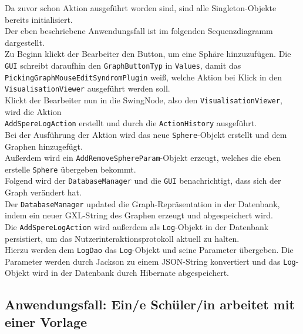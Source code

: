 \documentclass[enabledeprecatedfontcommands,fontsize=11pt,paper=a4,twoside]{scrartcl}
\begin{document}
	Da zuvor schon Aktion ausgeführt worden sind, sind alle Singleton-Objekte bereits initialisiert. \\
	Der eben beschriebene Anwendungsfall ist im folgenden Sequenzdiagramm dargestellt. \\
	Zu Beginn klickt der Bearbeiter den Button, um eine Sphäre hinzuzufügen. Die \texttt{GUI} schreibt daraufhin den \texttt{GraphButtonTyp} in \texttt{Values}, damit das \texttt{PickingGraphMouseEditSyndromPlugin} weiß, welche Aktion bei Klick in den \texttt{VisualisationViewer} ausgeführt werden soll. \\
	Klickt der Bearbeiter nun in die SwingNode, also den  \texttt{VisualisationViewer}, wird die Aktion\\ \texttt{AddSpereLogAction} erstellt und durch die \texttt{ActionHistory} ausgeführt. \\
	Bei der Ausführung der Aktion wird das neue \texttt{Sphere}-Objekt erstellt und dem Graphen hinzugefügt. \\
	Außerdem wird ein \texttt{AddRemoveSphereParam}-Objekt erzeugt, welches die eben erstelle \texttt{Sphere} übergeben bekommt. \\
	Folgend wird der \texttt{DatabaseManager} und die \texttt{GUI} benachrichtigt, dass sich der Graph verändert hat. \\
	Der \texttt{DatabaseManager} updated die Graph-Repräsentation in der Datenbank, indem ein neuer GXL-String des Graphen erzeugt und abgespeichert wird.\\
	Die \texttt{AddSpereLogAction} wird außerdem als \texttt{Log}-Objekt in der Datenbank persistiert, um das Nutzerinteraktionsprotokoll aktuell zu halten. \\
	Hierzu werden dem \texttt{LogDao} das \texttt{Log}-Objekt und seine Parameter übergeben. Die Parameter werden durch Jackson zu einem JSON-String konvertiert und das \texttt{Log}-Objekt wird in der Datenbank durch Hibernate abgespeichert.
	
	
	
	
	
	
	
	
	
	
	\newpage
	
	\subsection{Anwendungsfall: Ein/e Schüler/in arbeitet mit einer Vorlage}
	
\end{document}
